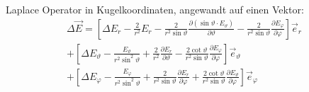 Laplace Operator in Kugelkoordinaten, angewandt auf einen Vektor:
\footnotesize{
            \begin{multline*}
                  \Delta \vec{E}  =\left[\Delta E_r-\frac{2}{r^{2}} E_r-\frac{2}{r^{2} \sin \vartheta} \frac{\partial\left(\sin \vartheta \cdot E_\vartheta\right)}{\partial \vartheta}-\frac{2}{r^{2} \sin \vartheta} \frac{\partial E_\varphi}{\partial \varphi}\right] \vec{e}_r        \\
                  +\left[\Delta E_\vartheta-\frac{E_\vartheta}{r^{2} \sin ^{2} \vartheta}+\frac{2}{r^{2}} \frac{\partial E_r}{\partial \vartheta}-\frac{2 \cot \vartheta}{r^{2} \sin \vartheta} \frac{\partial E_\varphi}{\partial \varphi}\right] \vec{e}_\vartheta       \\
                  +\left[\Delta E_\varphi-\frac{E_\varphi}{r^{2} \sin ^{2} \vartheta}+\frac{2}{r^{2} \sin \vartheta} \frac{\partial E_r}{\partial \varphi}+\frac{2 \cot \vartheta}{r^{2} \sin \vartheta} \frac{\partial E_\vartheta}{\partial \varphi}\right] \vec{e}_\varphi
            \end{multline*}
        }
